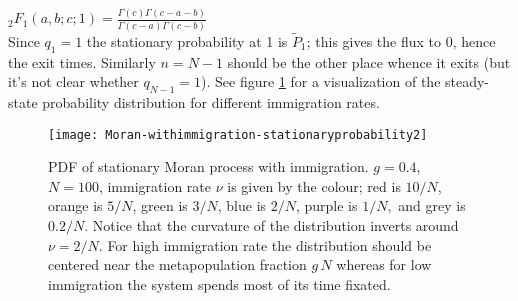 $_2F_1(a,b;c;1) = \frac{\Gamma(c)\Gamma(c-a-b)}{\Gamma(c-a)\Gamma(c-b)}$ \\
Since $q_1=1$ the stationary probability at 1 is $\widetilde{P}_1$; this gives the flux to 0, hence the exit times. 
Similarly $n=N-1$ should be the other place whence it exits (but it's not clear whether $q_{N-1}=1$). 
\fi
See figure \ref{stationary-fig2} for a visualization of the steady-state probability distribution for different immigration rates. %
\begin{figure}[ht]
	\centering
	\texttt{[image: Moran-withimmigration-stationaryprobability2]}
	\caption{PDF of stationary Moran process with immigration. $g=0.4$, $N=100$, immigration rate $\nu$ is given by the colour; red is $10/N$, orange is $5/N$, green is $3/N$, blue is $2/N$, purple is $1/N,$ and grey is $0.2/N$. Notice that the curvature of the distribution inverts around $\nu=2/N$. For high immigration rate the distribution should be centered near the metapopulation fraction $g\,N$ whereas for low immigration the system spends most of its time fixated. } \label{stationary-fig2}
\end{figure}

